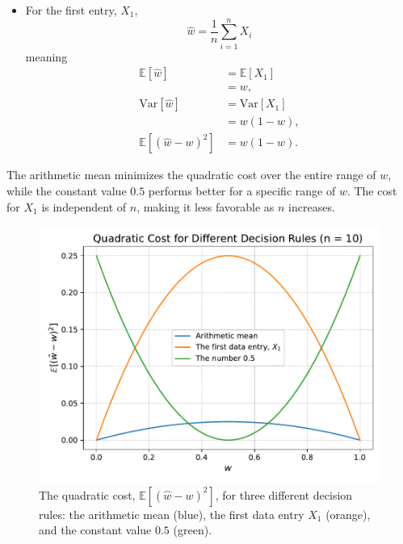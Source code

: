 \begin{example}
\begin{itemize}
		\item For the first entry, $X_1$,
		\begin{equation}
			\hat{w}=\frac{1}{n}\sum_{i=1}^nX_i
		\end{equation}
		meaning
		\begin{equation}
			\begin{split}
				\mathbb{E}[\hat{w}] & = \mathbb{E}[X_1]\\
				&=w,\\
				\text{Var}[\hat{w}]	&= \text{Var}[X_1]\\
				& = w(1-w),\\
				\mathbb{E}[(\hat{w}-w)^2]&=w(1-w).
			\end{split} 
		\end{equation}
	\end{itemize}
	The arithmetic mean minimizes the quadratic cost over the entire range of $w$, while the constant value $0.5$ performs better for a specific range of $w$. The cost for $X_1$ is independent of $n$, making it less favorable as $n$ increases.	
	\begin{figure}[H]
		\captionsetup{width=1\textwidth}
		\centering
		\includegraphics[width=1\textwidth]{figures/ber_example.pdf}
		\caption{The quadratic cost, $\mathbb{E}[(\hat{w} - w)^2]$, for three different decision rules: the arithmetic mean (blue), the first data entry $X_1$ (orange), and the constant value $0.5$ (green).}
		\label{fig:pen}
	\end{figure}
	
\end{example}

